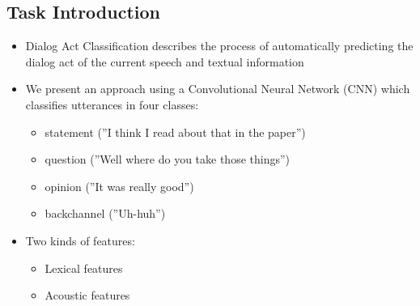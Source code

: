 \documentclass[a0,landscape]{a0poster}
\begin{document}
\begin{multicols}{3} %

\color{Black} %

\section*{Task Introduction}


\begin{itemize}
	\large
	\item Dialog Act Classification describes the process of automatically predicting the dialog act
	of the current speech and textual information
	\item We present an approach using a Convolutional Neural Network (CNN) which classifies utterances in four classes:
	\begin{itemize}
		\item statement (''I think I read about that in the paper'')
		\item question (''Well where do you take those things'')
		\item opinion (''It was really good'')
		\item backchannel (''Uh-huh'')
	\end{itemize}
	\item Two kinds of features:
	\begin{itemize}
		\item Lexical features
		\item Acoustic features 
	\end{itemize}
\end{itemize}


\end{multicols}
\end{document}
